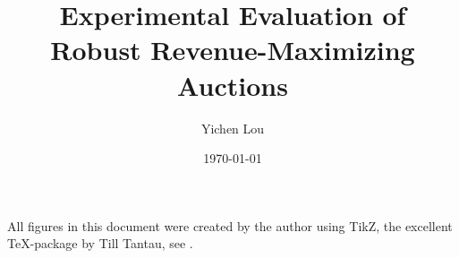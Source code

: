 \documentclass[]{tumthesis}
\author{Yichen Lou}
\title{Experimental Evaluation of \\Robust Revenue-Maximizing Auctions}
\institute{Department of Mathematics}
\date{\today} %
\begin{document}
\pagestyle{empty}
\frontmatter%
\maketitlepage%
\makedeclaration%


\tableofcontents%

\mainmatter%
\pagestyle{headings}




%
%
%

\appendix

%
\backmatter

\listoffigures

\vspace*{1.5cm}

All figures in this document were created by the author using TikZ, the excellent \TeX-package by Till Tantau, see \cite{Tantau2007}.



\listoftables






\printbibliography[title={References}]


%
\end{document}
